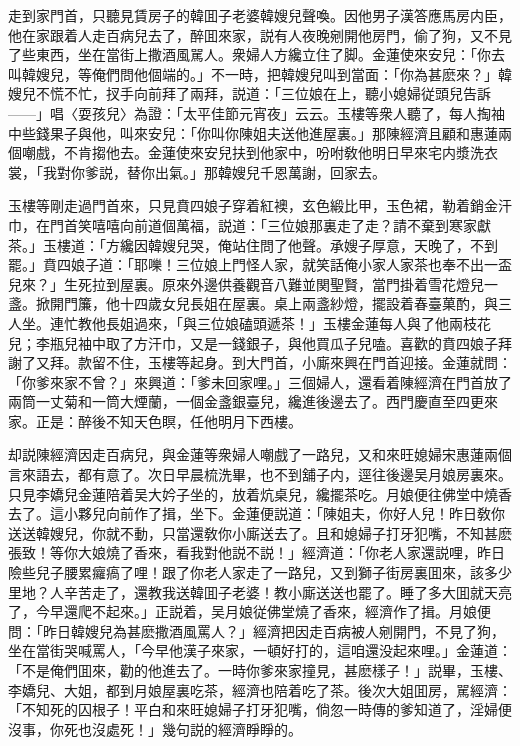 走到家門首，只聽見賃房子的韓囬子老婆韓嫂兒聲喚。因他男子漢答應馬房内臣，他在家跟着人走百病兒去了，醉囬來家，説有人夜晚剜開他房門，偷了狗，又不見了些東西，坐在當街上撒酒風駡人。衆婦人方纔立住了脚。金蓮使來安兒：「你去叫韓嫂兒，等俺們問他個端的。」不一時，把韓嫂兒叫到當面：「你為甚麽來？」韓嫂兒不慌不忙，扠手向前拜了兩拜，説道：「三位娘在上，聽小媳婦従頭兒告訴——」唱〈耍孩兒〉為證：「太平佳節元宵夜」云云。玉樓等衆人聽了，每人掏袖中些錢果子與他，叫來安兒：「你叫你陳姐夫送他進屋裏。」那陳經濟且顧和惠蓮兩個嘲戲，不肯搊他去。金蓮使來安兒扶到他家中，吩咐敎他明日早來宅内漿洗衣裳，「我對你爹説，替你出氣。」那韓嫂兒千恩萬謝，回家去。

玉樓等剛走過門首來，只見賁四娘子穿着紅襖，玄色緞比甲，玉色裙，勒着銷金汗巾，在門首笑嘻嘻向前道個萬福，説道：「三位娘那裏走了走？請不棄到寒家獻茶。」玉樓道：「方纔因韓嫂兒哭，俺站住問了他聲。承嫂子厚意，天晚了，不到罷。」賁四娘子道：「耶嚛！三位娘上門怪人家，就笑話俺小家人家茶也奉不出一盃兒來？」生死拉到屋裏。原來外邊供養觀音八難並関聖賢，當門掛着雪花燈兒一盞。掀開門簾，他十四歲女兒長姐在屋裏。桌上兩盞紗燈，擺設着春臺菓酌，與三人坐。連忙教他長姐過來，「與三位娘磕頭遞茶！」玉樓金蓮每人與了他兩枝花兒；李瓶兒袖中取了方汗巾，又是一錢銀子，與他買瓜子兒嗑。喜歡的賁四娘子拜謝了又拜。款留不住，玉樓等起身。到大門首，小廝來興在門首迎接。金蓮就問：「你爹來家不曾？」來興道：「爹未回家哩。」三個婦人，還看着陳經濟在門首放了兩筒一丈菊和一筒大煙蘭，一個金盞銀臺兒，纔進後邊去了。西門慶直至四更來家。正是：醉後不知天色瞑，任他明月下西樓。

却説陳經濟因走百病兒，與金蓮等衆婦人嘲戲了一路兒，又和來旺媳婦宋惠蓮兩個言來語去，都有意了。次日早晨梳洗畢，也不到舖子内，逕往後邊吴月娘房裏來。只見李嬌兒金蓮陪着吴大妗子坐的，放着炕桌兒，纔擺茶吃。月娘便往佛堂中燒香去了。這小夥兒向前作了揖，坐下。金蓮便説道：「陳姐夫，你好人兒！昨日敎你送送韓嫂兒，你就不動，只當還敎你小廝送去了。且和媳婦子打牙犯嘴，不知甚麽張致！等你大娘燒了香來，看我對他説不説！」經濟道：「你老人家還説哩，昨日險些兒子腰累㿚瘑了哩！跟了你老人家走了一路兒，又到獅子街房裏囬來，該多少里地？人辛苦走了，還教我送韓囬子老婆！教小廝送送也罷了。睡了多大囬就天亮了，今早還爬不起來。」正説着，吴月娘従佛堂燒了香來，經濟作了揖。月娘便問：「昨日韓嫂兒為甚麽撒酒風罵人？」經濟把因走百病被人剜開門，不見了狗，坐在當街哭喊罵人，「今早他漢子來家，一頓好打的，這咱還没起來哩。」金蓮道：「不是俺們囬來，勸的他進去了。一時你爹來家撞見，甚麽樣子！」説畢，玉樓、李嬌兒、大姐，都到月娘屋裏吃茶，經濟也陪着吃了茶。後次大姐囬房，駡經濟：「不知死的囚根子！平白和來旺媳婦子打牙犯嘴，倘忽一時傳的爹知道了，淫婦便沒事，你死也沒處死！」幾句説的經濟睜睜的。


